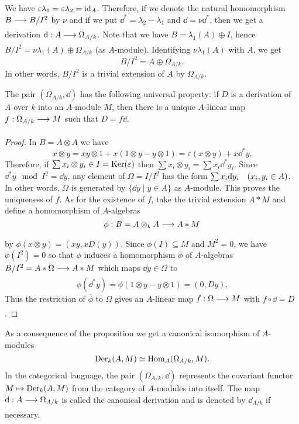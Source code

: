 \documentclass[../main]{subfiles}
\begin{document}
We have $\varepsilon \lambda_1=\varepsilon \lambda_2=\operatorname{id}_A$. Therefore, if we denote the natural homomorphism $B \varrightarrow{} B / I^2$ by $\nu$ and if we put $\dd^\ast=\lambda_2-\lambda_1$ and $\dd=\nu \dd^*$, then we get a derivation $\dd: A \varrightarrow{} \Omega_{A / k}$. Note that we have $B=\lambda_1(A) \oplus I$, hence $B / I^2=\nu \lambda_1(A) \oplus \Omega_{A / k}$ (as $A$-module). Identifying $\nu \lambda_1(A)$ with $A$, we get
\[
B / I^2=A \oplus \Omega_{A/k}.
\]
In other words, $B / I^2$ is a trivial extension of $A$ by $\Omega_{A/k}$.

\begin{proposition}\label{prop:26.01}
The pair $(\Omega_{A/k}, \dd)$ has the following universal property: if $D$ is a derivation of $A$ over $k$ into an $A$-module $M$, then there is a unique $A$-linear map $f: \Omega_{A / k} \varrightarrow{} M$ such that $D=f \dd$.
\end{proposition}
\begin{proof}
In $B=A \otimes A$ we have \[x \otimes y=x y \otimes 1+x(1 \otimes y-y \otimes 1)=\varepsilon(x \otimes y)+x \dd^\ast y.\] Therefore, if $\sum x_i \otimes y_i \in I=\operatorname{Ker}(\varepsilon)$ then $\sum x_i \otimes y_i=\sum x_i \dd^{\ast} y_i$. Since $\dd^\ast y \mod I^2=\dd y$, any element of $\Omega= I/ I^2$ has the form $\sum x_i \dd y_i\for{x_i, y_i\in A}$. In other words, $\Omega$ is generated by $\{\dd y \mid y \in A\}$ as $A$-module. This proves the uniqueness of $f$. As for the existence of $f$, take the trivial extension $A\ast M$ and define a homomorphism of $A$-algebras \[\phi: B=A \otimes_k A \varrightarrow{} A \ast M\] by $\phi(x \otimes y)=(x y, x D(y))$. Since $\phi(I) \subseteq M$ and $M^2=0$, we have $\phi(I^2)=0$ so that $\phi$ induces a homomorphism $\overline{\phi}$ of $A$-algebras $B / I^2=A * \Omega \varrightarrow{} A \ast M$ which maps $\dd y \in \Omega$ to \[\phi(\dd^* y)=\phi(1 \otimes y-y \otimes 1)=(0, D y).\] Thus the restriction of $\overline{\phi}$ to $\Omega$ gives an $A$-linear map \newline $f: \Omega \varrightarrow{} M$ with $f \circ \dd=D$.
\end{proof}

As a consequence of the proposition we get a canonical isomorphism of $A$-modules
\[
\operatorname{Der}_k(A, M) \simeq \operatorname{Hom}_A(\Omega_{A/k}, M) .
\]
In the categorical language, the pair $(\Omega_{A/k}, \dd)$ represents the covariant functor $M \mapsto \operatorname{Der}_k(A, M)$ from the category of $A$-modules into itself. The map \newline $\dd: A \varrightarrow{} \Omega_{A / k}$ is called the canonical derivation and is denoted by $\dd_{A / k}$ if necessary.
\end{document}
